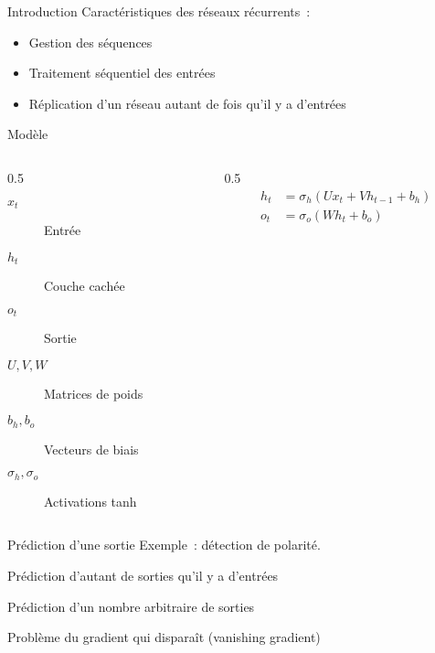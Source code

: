 \begin{frame}{Introduction}
  Caractéristiques des réseaux récurrents~:

  \begin{itemize}[<+->]
    \item Gestion des séquences
    \item Traitement séquentiel des entrées
    \item Réplication d'un réseau autant de fois qu'il y a d'entrées
  \end{itemize}
\end{frame}

\begin{frame}{Modèle}

  \begin{columns}
    \begin{column}{0.5\tw}
      \begin{description}
        \item[$x_t$] Entrée
        \item[$h_t$] Couche cachée
        \item[$o_t$] Sortie
        \item[$U, V, W$] Matrices de poids
        \item[$b_h, b_o$] Vecteurs de biais
        \item[$\sigma_h, \sigma_o$] Activations tanh
      \end{description}
    \end{column}
    \begin{column}{0.5\tw}
      \begin{align*}
      h_t & = \sigma_h(U x_t + V h_{t - 1} + b_h) \\
      o_t & = \sigma_o(W h_t + b_o) \\
      \end{align*}
    \end{column}
  \end{columns}
\end{frame}

\begin{frame}{Prédiction d'une sortie}
  Exemple~: détection de polarité.

  \begin{figure}
    \centering
  \end{figure}
\end{frame}

\begin{frame}{Prédiction d'autant de sorties qu'il y a d'entrées}
\end{frame}

\begin{frame}{Prédiction d'un nombre arbitraire de sorties}
\end{frame}

\begin{frame}{Problème du gradient qui disparaît (vanishing gradient)}
\end{frame}
